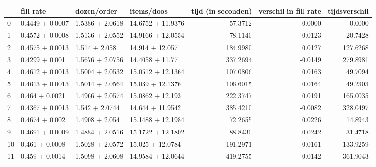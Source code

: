 \begin{tabular}{llllrrr}
\toprule
{} &        fill rate &      dozen/order &         items/doos &  tijd (in seconden) &  verschil in fill rate &  tijdsverschil \\
\midrule
0  &  0.4449 + 0.0007 &  1.5386 + 2.0618 &  14.6752 + 11.9376 &             57.3712 &                 0.0000 &         0.0000 \\
1  &  0.4572 + 0.0008 &  1.5136 + 2.0552 &  14.9166 + 12.0554 &             78.1140 &                 0.0123 &        20.7428 \\
2  &  0.4575 + 0.0013 &    1.514 + 2.058 &    14.914 + 12.057 &            184.9980 &                 0.0127 &       127.6268 \\
3  &   0.4299 + 0.001 &  1.5676 + 2.0756 &    14.4058 + 11.77 &            337.2694 &                -0.0149 &       279.8981 \\
4  &  0.4612 + 0.0013 &  1.5004 + 2.0532 &  15.0512 + 12.1364 &            107.0806 &                 0.0163 &        49.7094 \\
5  &  0.4613 + 0.0013 &  1.5014 + 2.0564 &   15.039 + 12.1376 &            106.6015 &                 0.0164 &        49.2303 \\
6  &   0.464 + 0.0021 &  1.4966 + 2.0574 &   15.0862 + 12.193 &            222.3747 &                 0.0191 &       165.0035 \\
7  &  0.4367 + 0.0013 &   1.542 + 2.0744 &   14.644 + 11.9542 &            385.4210 &                -0.0082 &       328.0497 \\
8  &   0.4674 + 0.002 &   1.4908 + 2.054 &  15.1488 + 12.1984 &             72.2655 &                 0.0226 &        14.8943 \\
9  &  0.4691 + 0.0009 &  1.4884 + 2.0516 &  15.1722 + 12.1802 &             88.8430 &                 0.0242 &        31.4718 \\
10 &   0.461 + 0.0008 &  1.5028 + 2.0572 &   15.025 + 12.0784 &            191.2971 &                 0.0161 &       133.9259 \\
11 &   0.459 + 0.0014 &  1.5098 + 2.0608 &  14.9584 + 12.0644 &            419.2755 &                 0.0142 &       361.9043 \\
\bottomrule
\end{tabular}

